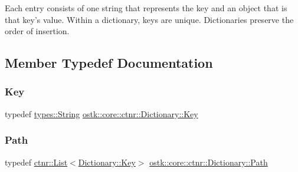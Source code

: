 Each entry consists of one string that represents the key and an object that is that key’s value. Within a dictionary, keys are unique. Dictionaries preserve the order of insertion. 

\subsection{Member Typedef Documentation}
\mbox{\label{classostk_1_1core_1_1ctnr_1_1_dictionary_aa3b171525039535f342d271d27f90407}} 
\subsubsection{\texorpdfstring{Key}{Key}}
{\footnotesize\ttfamily typedef \hyperlink{classostk_1_1core_1_1types_1_1_string}{types\+::\+String} \hyperlink{classostk_1_1core_1_1ctnr_1_1_dictionary_aa3b171525039535f342d271d27f90407}{ostk\+::core\+::ctnr\+::\+Dictionary\+::\+Key}}

\mbox{\label{classostk_1_1core_1_1ctnr_1_1_dictionary_a16012818d15768ac570985d935c5067c}} 
\subsubsection{\texorpdfstring{Path}{Path}}
{\footnotesize\ttfamily typedef \hyperlink{namespaceostk_1_1core_1_1ctnr_a5802e21d045076175dcb310a7045c858}{ctnr\+::\+List}$<$\hyperlink{classostk_1_1core_1_1ctnr_1_1_dictionary_aa3b171525039535f342d271d27f90407}{Dictionary\+::\+Key}$>$ \hyperlink{classostk_1_1core_1_1ctnr_1_1_dictionary_a16012818d15768ac570985d935c5067c}{ostk\+::core\+::ctnr\+::\+Dictionary\+::\+Path}}

\mbox{\label{classostk_1_1core_1_1ctnr_1_1_dictionary_ace6ab82268031e972455affca8730c9c}} 
